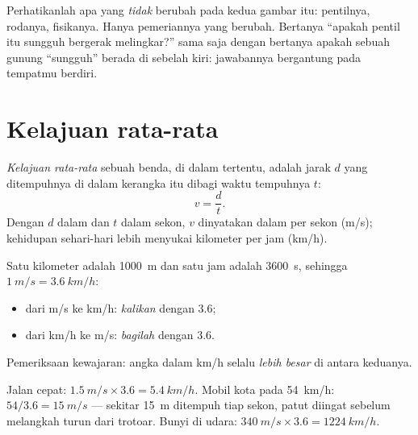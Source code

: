 \begin{remark}
Perhatikanlah apa yang \emph{tidak} berubah pada kedua gambar itu:
pentilnya, rodanya, fisikanya. Hanya pemeriannya yang berubah.
Bertanya ``apakah pentil itu sungguh bergerak melingkar?'' sama saja
dengan bertanya apakah sebuah gunung ``sungguh'' berada di sebelah
kiri: jawabannya bergantung pada tempatmu berdiri.
\end{remark}

\section{Kelajuan rata-rata}

\begin{definition}\label{def:g10:relative-motion:speed}
\emph{Kelajuan rata-rata} sebuah benda, di
dalam  tertentu, adalah jarak $d$ yang ditempuhnya di
dalam kerangka itu dibagi waktu tempuhnya $t$:
\[
v = \frac{d}{t} .
\]
Dengan $d$ dalam  dan $t$ dalam sekon, $v$ dinyatakan dalam 
per sekon (\unit{m/s}); kehidupan sehari-hari lebih menyukai kilometer
per jam (\unit{km/h}).
\end{definition}

\begin{method}\label{met:g10:relative-motion:convert}
Satu kilometer adalah \qty{1000}{m} dan satu jam adalah \qty{3600}{s},
sehingga $\qty{1}{m/s} = \qty{3.6}{km/h}$:
\begin{itemize}
  \item dari \unit{m/s} ke \unit{km/h}: \emph{kalikan} dengan $3.6$;
  \item dari \unit{km/h} ke \unit{m/s}: \emph{bagilah} dengan $3.6$.
\end{itemize}
Pemeriksaan kewajaran: angka dalam \unit{km/h} selalu \emph{lebih
besar} di antara keduanya.
\end{method}

\begin{example}\label{ex:g10:relative-motion:convert}
Jalan cepat: $\qty{1.5}{m/s} \times 3.6 = \qty{5.4}{km/h}$. Mobil kota
pada \qty{54}{km/h}: $54 / 3.6 = \qty{15}{m/s}$ --- sekitar \qty{15}{m}
ditempuh tiap sekon, patut diingat sebelum melangkah turun dari trotoar.
Bunyi di udara: $\qty{340}{m/s} \times 3.6 = \qty{1224}{km/h}$.
\end{example}

